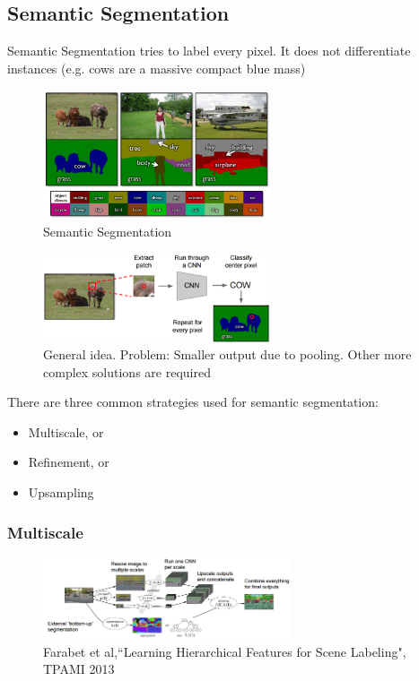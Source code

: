 \subsection{Semantic Segmentation}
Semantic Segmentation tries to label every pixel. It does not differentiate instances (e.g. cows are a massive compact blue mass)
\begin{figure}[h]
  \centering
  \includegraphics[width=0.6\textwidth]{Images/applications/14.png}
  \caption{Semantic Segmentation}
\end{figure}

\begin{figure}[h]
  \centering
  \includegraphics[width=0.6\textwidth]{Images/applications/15.png}
  \caption{General idea. Problem: Smaller output due to pooling. Other more complex solutions are required }
\end{figure}


There are three common strategies used for semantic segmentation:

\begin{itemize}
\item Multiscale, or
\item Refinement, or
\item Upsampling
\end{itemize}

\subsubsection*{Multiscale}

\begin{figure}[h]
  \centering
  \includegraphics[width=0.65\textwidth]{Images/applications/16.png}
  \caption{Farabet et al,``Learning Hierarchical Features for Scene Labeling", TPAMI 2013}
\end{figure}


